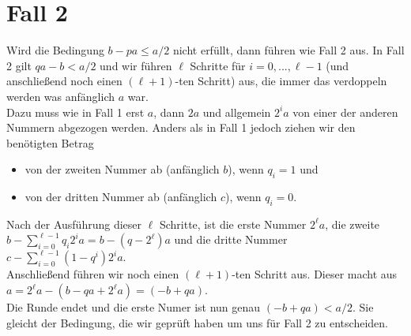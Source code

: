 \section{Fall 2} \label{case-2}
Wird die Bedingung $b-pa \leq a/2$ nicht erfüllt, dann führen wie Fall 2 aus. 
In Fall 2 gilt $qa-b < a/2$ und wir führen $\ell$ Schritte für $i=0, ..., \ell-1$ (und anschließend noch einen $(\ell +1)$-ten Schritt) aus, die immer das verdoppeln werden was anfänglich $a$ war. \\
Dazu muss wie in Fall 1 erst $a$, dann $2a$ und allgemein $2^ia$ von einer der anderen Nummern abgezogen werden. 
Anders als in Fall 1 jedoch ziehen wir den benötigten Betrag 
\begin{itemize}
    \item von der zweiten Nummer ab (anfänglich $b$), wenn $q_i = 1$ und
    \item von der dritten Nummer ab (anfänglich $c$), wenn $q_i = 0$.
\end{itemize}

Nach der Ausführung dieser $\ell$ Schritte, ist die erste Nummer $2^\ell a$, die zweite $b- \sum_{i=0}^{\ell-1} q_i2^ia = b-(q-2^\ell)a$ und die dritte Nummer $c- \sum_{i=0}^{\ell-1} (1-q^i)2^ia$. \\
Anschließend führen wir noch einen $(\ell +1)$-ten Schritt aus. Dieser macht aus $a = 2^\ell a- (b-qa+2^\ell a) = (-b+qa)$. \\
Die Runde endet und die erste Numer ist nun genau $(-b+qa) < a/2$. Sie gleicht der Bedingung, die wir geprüft haben um uns für Fall 2 zu entscheiden.